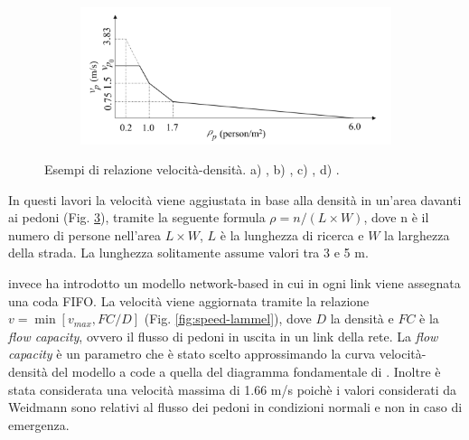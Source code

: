 \begin{figure}[ht]
\begin{subfigure}{0.45\textwidth}
        \caption{}
        \label{fig:speed-goto}
    \end{subfigure}
    \hfill
    \begin{subfigure}{0.45\textwidth}
        \includegraphics[width=\textwidth]{images/speed_WANG.png}
        \caption{}
        \label{fig:speed-wang}
    \end{subfigure}
    \caption{Esempi di relazione velocità-densità.
        a) \textcite[]{lammel2010emergency},
        b) \textcite[]{takabatake2017simulated},
        c) \textcite[]{goto2012tsunami},
        d) \textcite[]{wang2021novel}.
    }
    \label{fig:speeds}
\end{figure}

In questi lavori la velocità viene aggiustata in base alla densità in un'area davanti ai pedoni (Fig. \ref{fig:speeds}), tramite la seguente formula
$\rho = n /(L \times W)$, dove n è il numero di persone nell'area $L \times W$, $L$ è la lunghezza di ricerca e $W$ la larghezza della strada.
%
La lunghezza solitamente assume valori tra 3 e 5 m.

\textcite{lammel2010emergency} invece ha introdotto un modello network-based in cui in ogni link viene assegnata una coda FIFO.
La velocità viene aggiornata tramite la relazione $v = \min[v_{max}, FC / D]$ (Fig. \ref{fig:speed-lammel}),
dove $D$ la densità e $FC$ è la \textit{flow capacity}, ovvero il flusso di pedoni in uscita in un link della rete.
La \textit{flow capacity} è un parametro che è stato scelto approssimando la curva velocità-densità del modello a code a quella
del diagramma fondamentale di \textcite{weidmann1993transporttechnik}. Inoltre è stata considerata una velocità massima di 1.66 m/s poichè i valori considerati da Weidmann sono relativi
al flusso dei pedoni in condizioni normali e non in caso di emergenza.


